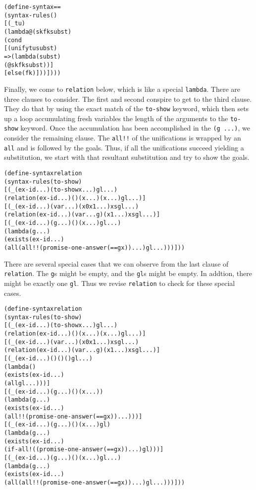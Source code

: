 \begin{alltt}
(define-syntax ==
  (syntax-rules ()
    [(_ t u)
     (lambda@ (sk fk subst)
       (cond
         [(unify t u subst)
          => (lambda (subst)
               (@ sk fk subst))]
         [else (fk)]))])))
\end{alltt}

Finally, we come to \texttt{relation} below, which is like a special
\texttt{lambda}.  There are three clauses to consider.  The first and
second conspire to get to the third clause.  They do that by using the
exact match of the \texttt{to-show} keyword, which then sets up a loop
accumulating fresh variables the length of the arguments to the
\texttt{to-show} keyword.  Once the accumulation has been accomplished
in the \texttt{(g ...)}, we consider the remaining clause.  The
\texttt{all!!} of the unifications is wrapped by an \texttt{all} and
is followed by the goals.  Thus, if all the unifications succeed
yielding a substitution, we start with that resultant substitution and
try to show the goals.

\begin{alltt}
(define-syntax relation
  (syntax-rules (to-show)
    [(_ (ex-id ...) (to-show x ...) gl ...)
     (relation (ex-id ...) () (x ...) (x ...) gl ...)]
    [(_ (ex-id ...) (var ...) (x0 x1 ...) xs gl ...)
     (relation (ex-id ...) (var ... g) (x1 ...) xs gl ...)]
    [(_ (ex-id ...) (g ...) () (x ...) gl ...)
     (lambda (g ...)
       (exists (ex-id ...)
         (all (all!! (promise-one-answer (== g x)) ...) gl ...)))]))
\end{alltt}

There are several special cases that we can observe from the last
clause of \texttt{relation}.  The \texttt{g}s might be empty, and the
\texttt{gl}s might be empty.  In addtion, there might be exactly one
\texttt{gl}.  Thus we revise \texttt{relation} to check for these
special cases.

\begin{alltt}
(define-syntax relation
  (syntax-rules (to-show)
    [(_ (ex-id ...) (to-show x ...) gl ...)
     (relation (ex-id ...) () (x ...) (x ...) gl ...)]
    [(_ (ex-id ...) (var ...) (x0 x1 ...) xs gl ...)
     (relation (ex-id ...) (var ... g) (x1 ...) xs gl ...)]
    [(_ (ex-id ...) () () () gl ...)
     (lambda ()
       (exists (ex-id ...)
         (all gl ...)))]
    [(_ (ex-id ...) (g ...) () (x ...))
     (lambda (g ...)
       (exists (ex-id ...)
 	 (all!! (promise-one-answer (== g x)) ...)))]
    [(_ (ex-id ...) (g ...) () (x ...) gl)
     (lambda (g ...)
       (exists (ex-id ...)
 	 (if-all! ((promise-one-answer (== g x)) ...) gl)))]
    [(_ (ex-id ...) (g ...) () (x ...) gl ...)
     (lambda (g ...)
       (exists (ex-id ...)
         (all (all!! (promise-one-answer (== g x)) ...) gl ...)))]))
\end{alltt}

